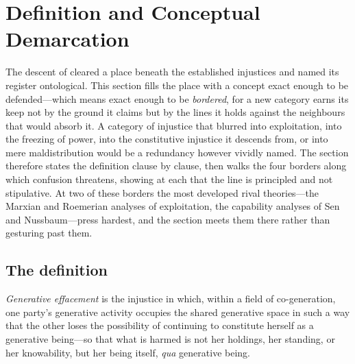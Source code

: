 \section{Definition and Conceptual Demarcation}
\label{p18:sec:definition}

\noindent
The descent of  cleared a place beneath the established injustices and named its register ontological. This section fills the place with a concept exact enough to be defended---which means exact enough to be \emph{bordered}, for a new category earns its keep not by the ground it claims but by the lines it holds against the neighbours that would absorb it. A category of injustice that blurred into exploitation, into the freezing of power, into the constitutive injustice it descends from, or into mere maldistribution would be a redundancy however vividly named. The section therefore states the definition clause by clause, then walks the four borders along which confusion threatens, showing at each that the line is principled and not stipulative. At two of these borders the most developed rival theories---the Marxian and Roemerian analyses of exploitation, the capability analyses of Sen and Nussbaum---press hardest, and the section meets them there rather than gesturing past them.

\subsection{The definition}
\label{p18:sub:def-statement}

\begin{claim}
\emph{Generative effacement} is the injustice in which, within a field of co-generation, one party's generative activity occupies the shared generative space in such a way that the other loses the possibility of continuing to constitute herself as a generative being---so that what is harmed is not her holdings, her standing, or her knowability, but her being itself, \emph{qua} generative being.
\end{claim}

